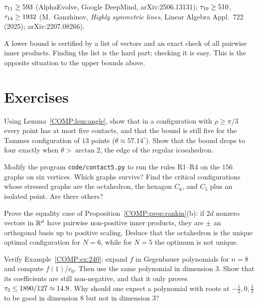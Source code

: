 \begin{theorem}
$\tau_{11}\ge593$ (AlphaEvolve, Google DeepMind, arXiv:2506.13131); $\tau_{10}\ge510$, $\tau_{14}\ge1932$
(M.~Ganzhinov, \emph{Highly symmetric lines}, Linear Algebra Appl.\ 722 (2025); arXiv:2207.08266).
\end{theorem}
\noindent A lower bound is certified by a list of vectors and an exact check of all pairwise inner products.
Finding the list is the hard part; checking it is easy. This is the opposite situation to the upper bounds above.

\section*{Exercises}

\begin{exercise}
Using Lemma~\ref{COMP:lem:angle}, show that in a configuration with $\rho\ge\pi/3$ every point has at most five
contacts, and that the bound is still five for the Tammes configuration of $13$ points
($\theta\approx57.14^\circ$). Show that the bound drops to four exactly when $\theta>\arctan2$, the edge of the
regular icosahedron.
\end{exercise}

\begin{exercise}
Modify the program \texttt{code/contact5.py} to run the rules R1--R4 on the $156$ graphs on six vertices.
Which graphs survive?
Find the critical configurations whose stressed graphs are the octahedron, the hexagon $C_6$, and $C_5$ plus an
isolated point. Are there others?
\end{exercise}

\begin{exercise}
Prove the equality case of Proposition~\ref{COMP:prop:rankin}(b): if $2d$ nonzero vectors in $\mathbb{R}^d$ have pairwise
non-positive inner products, they are $\pm$ an orthogonal basis up to positive scaling. Deduce that the octahedron
is the unique optimal configuration for $N=6$, while for $N=5$ the optimum is not unique.
\end{exercise}

\begin{exercise}
Verify Example~\ref{COMP:ex:240}: expand $f$ in Gegenbauer polynomials for $n=8$ and compute $f(1)/c_0$. Then
use the same polynomial in dimension $3$. Show that its coefficients are still non-negative, and that it only
proves $\tau_3\le1890/127\approx14.9$. Why should one expect a polynomial with roots at $-\frac12,0,\frac12$ to
be good in dimension $8$ but not in dimension $3$?
\end{exercise}

